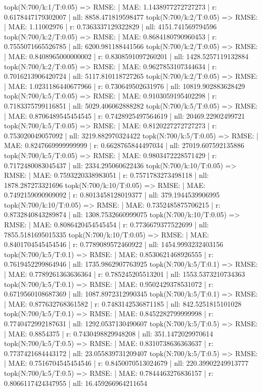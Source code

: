 topk(N:700/k:1/T:0.05) => RMSE: | MAE: 1.1438977272727273 | r: 0.6178447179302007 | nll: 8858.471819598477
topk(N:700/k:2/T:0.05) => RMSE: | MAE: 1.11002976 | r: 0.7363337129322829 | nll: 4151.741569794596
topk(N:700/k:2/T:0.05) => RMSE: | MAE: 0.8684180790960453 | r: 0.7555071665526785 | nll: 6200.981188441566
topk(N:700/k:2/T:0.05) => RMSE: | MAE: 0.8408965000000002 | r: 0.8308591097260201 | nll: 1428.5257119132884
topk(N:700/k:2/T:0.05) => RMSE: | MAE: 0.9627853107344634 | r: 0.7016213906420724 | nll: 5117.810118727265
topk(N:700/k:2/T:0.05) => RMSE: | MAE: 1.0231186440677966 | r: 0.730649502631976 | nll: 10819.902883628429
topk(N:700/k:5/T:0.05) => RMSE: | MAE: 0.9103059195402298 | r: 0.7183375799116851 | nll: 5029.406062888282
topk(N:700/k:5/T:0.05) => RMSE: | MAE: 0.8706489545454545 | r: 0.7428925497564619 | nll: 20469.22902499721
topk(N:700/k:5/T:0.05) => RMSE: | MAE: 0.8120227272727273 | r: 0.753020049057092 | nll: 3219.882970324422
topk(N:700/k:5/T:0.05) => RMSE: | MAE: 0.8247669999999999 | r: 0.6628765844497034 | nll: 27019.607592135886
topk(N:700/k:5/T:0.05) => RMSE: | MAE: 0.9803472228571429 | r: 0.7172480083045437 | nll: 2334.295060622436
topk(N:700/k:10/T:0.05) => RMSE: | MAE: 0.7593220338983051 | r: 0.7571783273498118 | nll: 1878.287273321696
topk(N:700/k:10/T:0.05) => RMSE: | MAE: 0.7492159090909092 | r: 0.8013458128019377 | nll: 379.1944539906995
topk(N:700/k:10/T:0.05) => RMSE: | MAE: 0.7352485875706215 | r: 0.8732840843289874 | nll: 1308.7532660999075
topk(N:700/k:10/T:0.05) => RMSE: | MAE: 0.8086420454545454 | r: 0.7736679377522699 | nll: 7855.5181695015335
topk(N:700/k:10/T:0.05) => RMSE: | MAE: 0.8401704545454546 | r: 0.7789089572460922 | nll: 1454.9993232403156
topk(N:700/k:5/T:0.1) => RMSE: | MAE: 0.8530621468926555 | r: 0.7619452299864946 | nll: 1735.9862907763925
topk(N:700/k:5/T:0.1) => RMSE: | MAE: 0.7789261363636364 | r: 0.785245205513201 | nll: 1553.5373210734363
topk(N:700/k:5/T:0.1) => RMSE: | MAE: 0.9502429378531072 | r: 0.6719560108687369 | nll: 1087.8972312990345
topk(N:700/k:5/T:0.1) => RMSE: | MAE: 0.877632768361582 | r: 0.7483142536871185 | nll: 842.5251815101028
topk(N:700/k:5/T:0.1) => RMSE: | MAE: 0.8452282799999998 | r: 0.7740472992187631 | nll: 1292.0537130490607
topk(N:700/k:5/T:0.5) => RMSE: | MAE: 0.8854375 | r: 0.7430498829948208 | nll: 351.1472029970614
topk(N:700/k:5/T:0.5) => RMSE: | MAE: 0.8310738636363637 | r: 0.7737421684443172 | nll: 23.055839731209407
topk(N:700/k:5/T:0.5) => RMSE: | MAE: 0.7516704545454546 | r: 0.8450070513024679 | nll: 220.39902249913777
topk(N:700/k:5/T:0.5) => RMSE: | MAE: 0.7844463276836157 | r: 0.8066117424347955 | nll: 16.459266964211654
